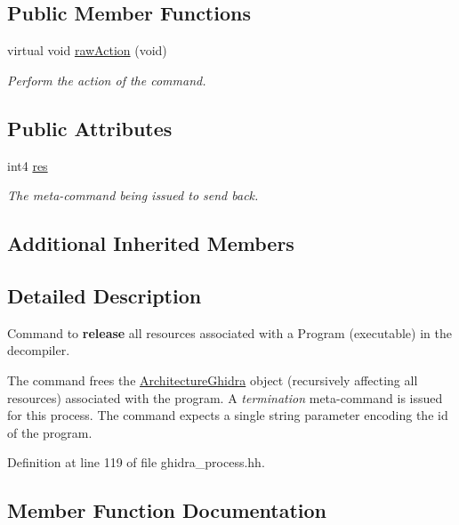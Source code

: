 \subsection*{Public Member Functions}
\begin{DoxyCompactItemize}
\item 
virtual void \mbox{\hyperlink{class_deregister_program_a3086821f7a4e57a5f3cf585513d48b73}{raw\+Action}} (void)
\begin{DoxyCompactList}\small\item\em Perform the action of the command. \end{DoxyCompactList}\end{DoxyCompactItemize}
\subsection*{Public Attributes}
\begin{DoxyCompactItemize}
\item 
int4 \mbox{\hyperlink{class_deregister_program_a16f594587cf7aca26cfd85143cba8c05}{res}}
\begin{DoxyCompactList}\small\item\em The meta-\/command being issued to send back. \end{DoxyCompactList}\end{DoxyCompactItemize}
\subsection*{Additional Inherited Members}


\subsection{Detailed Description}
Command to {\bfseries{release}} all resources associated with a Program (executable) in the decompiler. 

The command frees the \mbox{\hyperlink{class_architecture_ghidra}{Architecture\+Ghidra}} object (recursively affecting all resources) associated with the program. A {\itshape termination} meta-\/command is issued for this process. The command expects a single string parameter encoding the id of the program. 

Definition at line 119 of file ghidra\+\_\+process.\+hh.



\subsection{Member Function Documentation}
\mbox{\label{class_deregister_program_a3086821f7a4e57a5f3cf585513d48b73}} 
